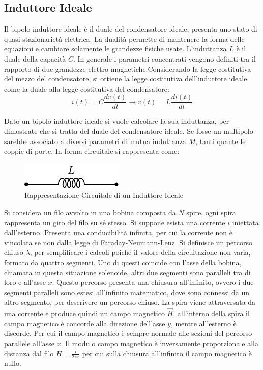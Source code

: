 \documentclass{article}
\numberwithin{equation}{subsection}
\begin{document}
\subsection{Induttore Ideale}
\label{sec:induttore-ideale}
Il bipolo induttore ideale è il duale del condensatore ideale, presenta uno stato di quasi-stazionarietà elettrica. La dualità permette di mantenere la forma delle equazioni 
e cambiare solamente le grandezze fisiche usate. L'induttanza $L$ è il duale della capacità $C$. In generale i parametri concentrati vengono definiti tra il rapporto di due 
grandezze elettro-magnetiche.Considerando la legge costitutiva del mezzo del condensatore, si ottiene la legge costitutiva dell'induttore ideale come la duale alla legge 
costitutiva del condensatore:
\begin{equation*}
    i(t)=\displaystyle C\frac{dv(t)}{dt}\to v(t)=L\frac{di(t)}{dt}
\end{equation*}


Dato un bipolo induttore ideale si vuole calcolare la sua induttanza, per dimostrate che si tratta del duale del condensatore ideale. Se fosse un multipolo sarebbe 
associato a diversi parametri di mutua induttanza $M$, tanti quante le coppie di porte. In forma circuitale si rappresenta come:
\begin{figure}[H]%
    \centering
    \includegraphics{induttore.pdf}
    \caption{Rappresentazione Circuitale di un Induttore Ideale}
    \label{fig:induttore-forma-circuitale}
\end{figure}
Si considera un filo avvolto in una bobina composta da $N$ spire, ogni spira rappresenta un giro del filo su sé stesso. Si suppone esista una corrente $i$ iniettata dall'esterno. 
Presenta una conducibilità infinita, per cui la corrente non è vincolata se non dalla legge di Faraday-Neumann-Lenz. Si definisce un percorso chiuso $\lambda$, per semplificare 
i calcoli poiché il valore della circuitazione non varia, formato da quattro segmenti. Uno di questi coincide con l'asse della bobina, chiamata in questa situazione solenoide, 
altri due segmenti sono paralleli tra di loro e all'asse $x$. Questo percorso presenta una chiusura all'infinito, ovvero i due segmenti paralleli sono estesi all'infinito 
matematico, dove sono connessi da un altro segmento, per descrivere un percorso chiuso. La spira viene attraversata da una corrente e produce quindi un campo magnetico $\vec{H}$, 
all'interno della spira il campo magnetico è concorde alla direzione dell'asse $y$, mentre all'esterno è discorde. Per cui il campo magnetico è sempre normale alle sezioni del 
percorso parallele all'asse $x$. Il modulo campo magnetico è inversamente proporzionale alla distanza dal filo $H=\displaystyle\frac{i}{2\pi r}$ per cui sulla chiusura all'infinito 
il campo magnetico è nullo. 
\end{document}
